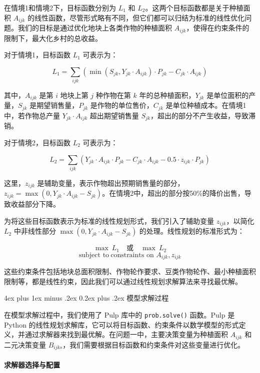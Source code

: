 \documentclass[12pt,a4paper]{nmmcm}
\makeatletter
\renewcommand\subsubsection{\@startsection{subsubsection}{3}{1em}%
  {4ex plus 1ex minus .2ex}%
  {0.2ex plus .2ex}%
  {\normalfont\large\bfseries}}
\makeatother
\begin{document}
在情境1和情境2下，目标函数分别为 $L_1$ 和 $L_2$。这两个目标函数都是关于种植面积 $A_{ijk}$ 的线性函数，尽管形式略有不同，但它们都可以归结为标准的线性优化问题。我们的目标是通过优化地块上各类作物的种植面积 $A_{ijk}$，使得在约束条件的限制下，最大化乡村的总收益。

对于情境1，目标函数 $L_1$ 可表示为：

\[
  L_1 = \sum_{ijk} \left( \min \left( S_{jk}, Y_{jk} \cdot A_{ijk} \right) \cdot P_{jk} - C_{jk} \cdot A_{ijk} \right)
\]

其中，$A_{ijk}$ 是第 $i$ 地块上第 $j$ 种作物在第 $k$ 年的总种植面积，$Y_{jk}$ 是单位面积的产量，$S_{jk}$ 是期望销售量，$P_{jk}$ 是作物的单位售价，$C_{jk}$ 是单位种植成本。在情境1中，若作物总产量 $Y_{jk} \cdot A_{ijk}$ 超出期望销售量 $S_{jk}$，超出的部分不产生收益，导致滞销。

对于情境2，目标函数 $L_2$ 可表示为：

\[
  L_2 = \sum_{ijk} \left( Y_{jk} \cdot A_{ijk} \cdot P_{jk} - C_{jk} \cdot A_{ijk} - 0.5 \cdot z_{ijk} \cdot P_{jk} \right)
\]

这里，$z_{ijk}$ 是辅助变量，表示作物超出预期销售量的部分，$z_{ijk} = \max(0, Y_{jk} \cdot A_{ijk} - S_{jk})$。在情境2中，超出的部分按50\%的降价出售，导致收益部分下降。

为将这些目标函数表示为标准的线性规划形式，我们引入了辅助变量 $z_{ijk}$，以简化 $L_2$ 中非线性部分 $\max(0, Y_{jk} \cdot A_{ijk} - S_{jk})$ 的处理。线性规划的标准形式为：

\[
  \max \ L_1 \quad \text{或} \quad \max \ L_2
\]
\[
  \text{subject to} \ \text{constraints on } A_{ijk}, z_{ijk}
\]

这些约束条件包括地块总面积限制、作物轮作要求、豆类作物轮作、最小种植面积限制等，都是线性约束，因此我们可以通过线性规划求解算法来寻找最优解。

\subsubsection{模型求解过程}

在模型求解过程中，我们使用了 Pulp 库中的 \texttt{prob.solve()} 函数。Pulp 是 Python 的线性规划求解库，它可以将目标函数、约束条件以数学模型的形式定义，并通过求解器来找到最优解。在问题一中，主要决策变量为种植面积 $A_{ijk}$ 和二元决策变量 $B_{ijks}$，我们需要根据目标函数和约束条件对这些变量进行优化。

\paragraph{求解器选择与配置}
\end{document}
